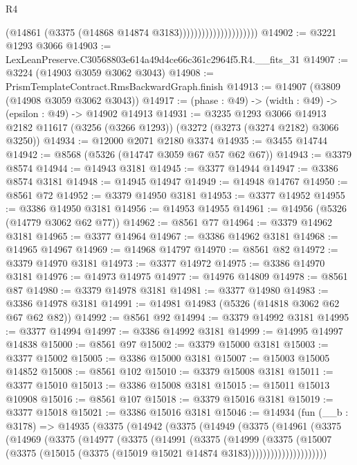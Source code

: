 \begin{lexlean}{R4}
\begin{coremodule}
                                        (@14861 (@3375 (@14868 @14874 @3183)))))))))))))))))))))
@14902 := @3221 @1293 @3066
@14903 := LexLeanPreserve.C30568803e614a49d4ce66c361c2964f5.R4.__fits_31
@14907 := @3224 (@14903 @3059 @3062 @3043)
@14908 := PrismTemplateContract.RmsBackwardGraph.finish
@14913 := @14907 (@3809 (@14908 @3059 @3062 @3043))
@14917 := (phase : @49) -> (width : @49) -> (epsilon : @49) -> @14902 @14913
@14931 := @3235
    @1293
    @3066
    @14913
    @2182
    @11617
    (@3256 (@3266 @1293))
    (@3272 (@3273 (@3274 @2182) @3066 @3250))
@14934 := @12000 @2071 @2180 @3374
@14935 := @3455 @14744
@14942 := @8568 (@5326 (@14747 @3059 @67 @57 @62 @67))
@14943 := @3379 @8574
@14944 := @14943 @3181
@14945 := @3377 @14944
@14947 := @3386 @8574 @3181
@14948 := @14945 @14947
@14949 := @14948 @14767
@14950 := @8561 @72
@14952 := @3379 @14950 @3181
@14953 := @3377 @14952
@14955 := @3386 @14950 @3181
@14956 := @14953 @14955
@14961 := @14956 (@5326 (@14779 @3062 @62 @77))
@14962 := @8561 @77
@14964 := @3379 @14962 @3181
@14965 := @3377 @14964
@14967 := @3386 @14962 @3181
@14968 := @14965 @14967
@14969 := @14968 @14797
@14970 := @8561 @82
@14972 := @3379 @14970 @3181
@14973 := @3377 @14972
@14975 := @3386 @14970 @3181
@14976 := @14973 @14975
@14977 := @14976 @14809
@14978 := @8561 @87
@14980 := @3379 @14978 @3181
@14981 := @3377 @14980
@14983 := @3386 @14978 @3181
@14991 := @14981 @14983 (@5326 (@14818 @3062 @62 @67 @62 @82))
@14992 := @8561 @92
@14994 := @3379 @14992 @3181
@14995 := @3377 @14994
@14997 := @3386 @14992 @3181
@14999 := @14995 @14997 @14838
@15000 := @8561 @97
@15002 := @3379 @15000 @3181
@15003 := @3377 @15002
@15005 := @3386 @15000 @3181
@15007 := @15003 @15005 @14852
@15008 := @8561 @102
@15010 := @3379 @15008 @3181
@15011 := @3377 @15010
@15013 := @3386 @15008 @3181
@15015 := @15011 @15013 @10908
@15016 := @8561 @107
@15018 := @3379 @15016 @3181
@15019 := @3377 @15018
@15021 := @3386 @15016 @3181
@15046 := @14934
    (fun (__b : @3178) =>
    @14935
      (@3375
        (@14942
          (@3375
            (@14949
              (@3375
                (@14961
                  (@3375
                    (@14969
                      (@3375
                        (@14977
                          (@3375
                            (@14991
                              (@3375
                                (@14999
                                  (@3375
                                    (@15007
                                      (@3375
                                        (@15015
                                          (@3375 (@15019 @15021 @14874 @3183)))))))))))))))))))))

\end{coremodule}
\end{lexlean}
